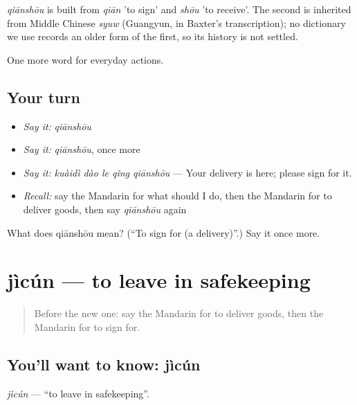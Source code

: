 \begin{cousinweb}
\emph{qiānshōu} is built from \emph{qiān} 'to sign' and \emph{shōu} 'to receive'. The second is inherited from Middle Chinese \emph{syuw} (Guangyun, in Baxter's transcription); no dictionary we use records an older form of the first, so its history is not settled.
\end{cousinweb}

\begin{grammarlens}[title={What you've built}]
One more word for everyday actions.
\end{grammarlens}

\subsection*{Your turn}
\begin{itemize}
\raggedright
  \item \emph{Say it:} \emph{qiānshōu}
  \item \emph{Say it:} \emph{qiānshōu}, once more
  \item \emph{Say it:} \emph{kuàidì dào le qǐng qiānshōu} — Your delivery is here; please sign for it.
  \item \emph{Recall:} say the Mandarin for what should I do, then the Mandarin for to deliver goods, then say \emph{qiānshōu} again
\end{itemize}

\begin{tcolorbox}[breakable,colback=teal!4,colframe=teal!35!black,title={Before you move on}]
What does qiānshōu mean? (\textquotedblleft{}To sign for (a delivery)\textquotedblright{}.) Say it once more.
\end{tcolorbox}
\section[jìcún]{jìcún — to leave in safekeeping}

\label{lesson:ZH-C215-jicun}



\begin{quote}
Before the new one: say the Mandarin for to deliver goods, then the Mandarin for to sign for.
\end{quote}

\subsection*{You'll want to know: jìcún}
\emph{jìcún} — \textquotedblleft{}to leave in safekeeping\textquotedblright{}.

